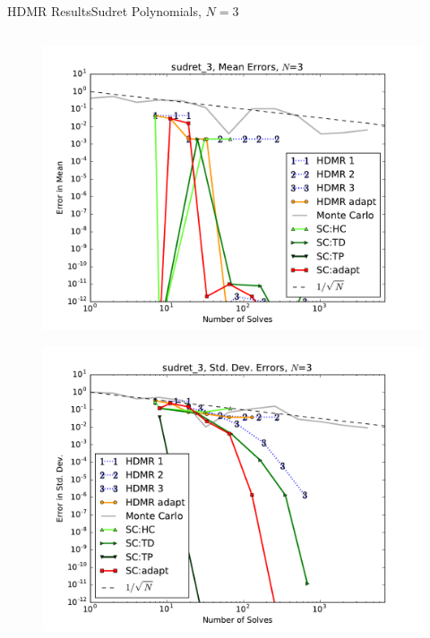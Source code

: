 \documentclass{beamer}
\begin{document}
\begin{frame}{HDMR Results}{Sudret Polynomials, $N=3$}
\begin{columns}
\begin{column}{0.5\textwidth}
\begin{figure}[h!]
          \includegraphics[width=0.8\linewidth]{anlmodels/sudret_3_mean_errs}
        \end{figure}
        \vspace{-20pt}
        \begin{figure}[h!]
          \centering
          \includegraphics[width=0.8\linewidth]{anlmodels/sudret_3_variance_errs}
        \end{figure}
   \end{column}
 \end{columns}
\end{frame}
\end{document}

